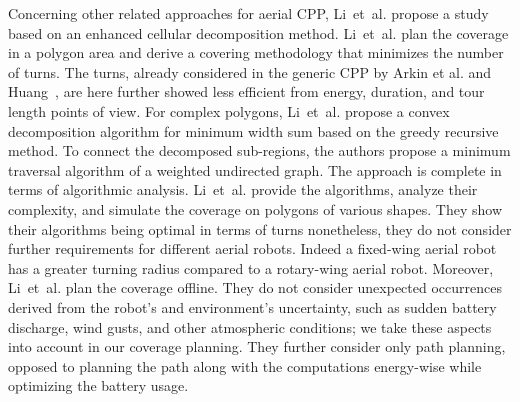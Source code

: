 Concerning other related approaches for aerial CPP, Li~et~al. propose a study~\citep{li2011coverage} based on an enhanced cellular decomposition method. Li~et~al. plan the coverage in a polygon area and derive a covering methodology that minimizes the number of turns. The turns, already considered in the generic CPP by Arkin et al. and Huang~\citep{arkin2001optimal,arkin2005optimal,huang2001optimal}, are here further showed less efficient from energy, duration, and tour length points of view. For complex polygons, Li~et~al. propose a convex decomposition algorithm for minimum width sum based on the greedy recursive method. To connect the decomposed sub-regions, the authors propose a minimum traversal algorithm of a weighted undirected graph. The approach is complete in terms of algorithmic analysis. Li~et~al. provide the algorithms, analyze their complexity, and simulate the coverage on polygons of various shapes. They show their algorithms being optimal in terms of turns nonetheless, they do not consider further requirements for different aerial robots. Indeed a fixed-wing aerial robot has a greater turning radius compared to a rotary-wing aerial robot. Moreover, Li~et~al. plan the coverage offline. They do not consider unexpected occurrences derived from the robot's and environment's uncertainty, such as sudden battery discharge, wind gusts, and other atmospheric conditions; we take these aspects into account in our coverage planning. They further consider only path planning, opposed to planning the path along with the computations energy-wise while optimizing the battery usage.

